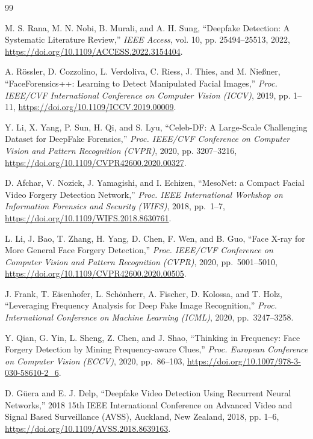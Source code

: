 \documentclass[pdflatex,sn-mathphys-num,iicol]{sn-jnl}
\begin{document}
\begin{thebibliography}{99}

M. S. Rana, M. N. Nobi, B. Murali, and A. H. Sung, ``Deepfake Detection: A Systematic Literature Review,'' \textit{IEEE Access}, vol. 10, pp. 25494--25513, 2022, \url{https://doi.org/10.1109/ACCESS.2022.3154404}.

A. R\"ossler, D. Cozzolino, L. Verdoliva, C. Riess, J. Thies, and M. Nie{\ss}ner, ``FaceForensics++: Learning to Detect Manipulated Facial Images,'' \textit{Proc. IEEE/CVF International Conference on Computer Vision (ICCV)}, 2019, pp. 1--11, \url{https://doi.org/10.1109/ICCV.2019.00009}.

Y. Li, X. Yang, P. Sun, H. Qi, and S. Lyu, ``Celeb-DF: A Large-Scale Challenging Dataset for DeepFake Forensics,'' \textit{Proc. IEEE/CVF Conference on Computer Vision and Pattern Recognition (CVPR)}, 2020, pp. 3207--3216, \url{https://doi.org/10.1109/CVPR42600.2020.00327}.

D. Afchar, V. Nozick, J. Yamagishi, and I. Echizen, ``MesoNet: a Compact Facial Video Forgery Detection Network,'' \textit{Proc. IEEE International Workshop on Information Forensics and Security (WIFS)}, 2018, pp.\ 1--7, \url{https://doi.org/10.1109/WIFS.2018.8630761}.

L. Li, J. Bao, T. Zhang, H. Yang, D. Chen, F. Wen, and B. Guo, ``Face X-ray for More General Face Forgery Detection,'' \textit{Proc. IEEE/CVF Conference on Computer Vision and Pattern Recognition (CVPR)}, 2020, pp.\ 5001--5010, \url{https://doi.org/10.1109/CVPR42600.2020.00505}.

J. Frank, T. Eisenhofer, L. Sch\"onherr, A. Fischer, D. Kolossa, and T. Holz, ``Leveraging Frequency Analysis for Deep Fake Image Recognition,'' \textit{Proc. International Conference on Machine Learning (ICML)}, 2020, pp.\ 3247--3258.

Y. Qian, G. Yin, L. Sheng, Z. Chen, and J. Shao, ``Thinking in Frequency: Face Forgery Detection by Mining Frequency-aware Clues,'' \textit{Proc. European Conference on Computer Vision (ECCV)}, 2020, pp.\ 86--103, \url{https://doi.org/10.1007/978-3-030-58610-2_6}.

D. G\"uera and E. J. Delp, ``Deepfake Video Detection Using Recurrent Neural Networks,'' 2018 15th IEEE International Conference on Advanced Video and Signal Based Surveillance (AVSS), Auckland, New Zealand, 2018, pp. 1--6, \url{https://doi.org/10.1109/AVSS.2018.8639163}.


\end{thebibliography}
\end{document}
